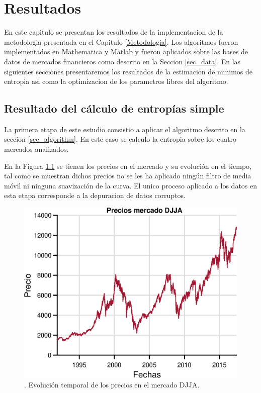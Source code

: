 %
\chapter{Resultados}
\label{Resultados}

En este capitulo se presentan los resultados de la implementacion de la metodologia presentada en el Capitulo \ref{Metodologia}. 
Los algoritmos fueron implementados en Mathematica y Matlab y fueron aplicados sobre las bases de datos de mercados financieros como descrito en la Seccion \ref{sec_data}.
En las siguientes secciones presentaremos los resultados de la estimacion de minimos de entropia asi como la optimizacion de los parametros libres del algoritmo.


\section{Resultado del cálculo de entropías simple}
La primera etapa de este estudio consistio a aplicar el algoritmo descrito en la seccion \ref{sec_algorithm}.
En este caso se calculo la entropia sobre los cuatro mercados analizados. 

En la Figura \ref{precioseps} se tienen los precios en el mercado y su evolución en el tiempo, tal como se muestran dichos precios no se les ha aplicado ningún filtro de media móvil ni ninguna suavización de la curva.
El unico proceso aplicado a los datos en esta etapa corresponde a la depuracion de datos corruptos.

\begin{figure}[h]
	\centering
	\includegraphics[width=0.7\linewidth]{figures/precioseps}
	\caption{. Evolución temporal de los precios en el mercado DJJA.}
	\label{precioseps}
\end{figure}


